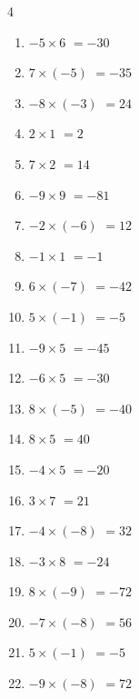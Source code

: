 \begin{multicols}{4}
\begin{enumerate}
  \item $-5\times 6$
        $=-30$

  \item $7\times (-5)$
        $=-35$

\columnbreak %

  \item $-8\times (-3)$
        $=24$

  \item $2\times 1$
        $=2$

  \item $7\times 2$
        $=14$

  \item $-9\times 9$
        $=-81$

  \item $-2\times (-6)$
        $=12$

  \item $-1\times 1$
        $=-1$

  \item $6\times (-7)$
        $=-42$

  \item $5\times (-1)$
        $=-5$

  \item $-9\times 5$
        $=-45$

  \item $-6\times 5$
        $=-30$

  \item $8\times (-5)$
        $=-40$

  \item $8\times 5$
        $=40$

  \item $-4\times 5$
        $=-20$

  \item $3\times 7$
        $=21$

  \item $-4\times (-8)$
        $=32$

  \item $-3\times 8$
        $=-24$

  \item $8\times (-9)$
        $=-72$

  \item $-7\times (-8)$
        $=56$

  \item $5\times (-1)$
        $=-5$

  \item $-9\times (-8)$
        $=72$


\end{enumerate}
\end{multicols}
